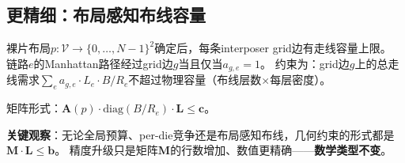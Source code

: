 \subsection{更精细：布局感知布线容量}

裸片布局$p: \mathcal{V} \to \{0,\ldots,N-1\}^2$确定后，每条interposer grid边有走线容量上限。
链路$e$的Manhattan路径经过grid边$g$当且仅当$a_{g,e}=1$。
约束为：grid边$g$上的总走线需求$\sum_e a_{g,e} \cdot L_e \cdot B/R_e$不超过物理容量（布线层数$\times$每层密度）。

矩阵形式：$\mathbf{A}(p) \cdot \text{diag}(B/R_e) \cdot \mathbf{L} \le \mathbf{c}$。

\textbf{关键观察}：无论全局预算、per-die竞争还是布局感知布线，几何约束的形式都是$\mathbf{M} \cdot \mathbf{L} \le \mathbf{b}$。
精度升级只是矩阵$\mathbf{M}$的行数增加、数值更精确——\textbf{数学类型不变}。
